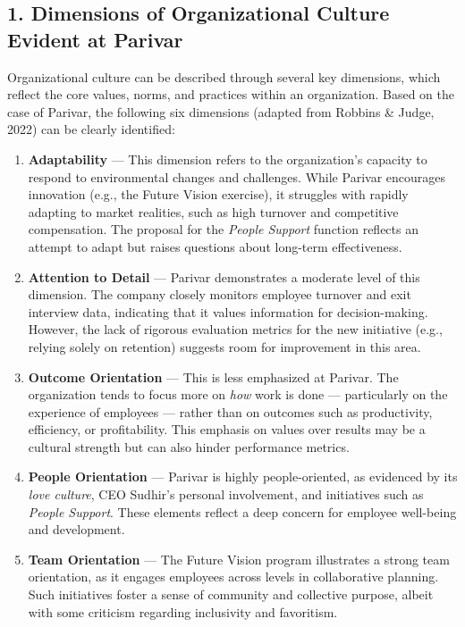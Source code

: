\documentclass[10pt,a4paper]{book}
\begin{document}
\begin{multicols}{2}
\subsection*{1. Dimensions of Organizational Culture Evident at Parivar}

Organizational culture can be described through several key dimensions, which reflect the core values, norms, and practices within an organization. Based on the case of Parivar, the following six dimensions (adapted from Robbins \& Judge, 2022) can be clearly identified:

\begin{enumerate}
    \item \textbf{Adaptability} --- This dimension refers to the organization's capacity to respond to environmental changes and challenges. While Parivar encourages innovation (e.g., the Future Vision exercise), it struggles with rapidly adapting to market realities, such as high turnover and competitive compensation. The proposal for the \textit{People Support} function reflects an attempt to adapt but raises questions about long-term effectiveness.

    \item \textbf{Attention to Detail} --- Parivar demonstrates a moderate level of this dimension. The company closely monitors employee turnover and exit interview data, indicating that it values information for decision-making. However, the lack of rigorous evaluation metrics for the new initiative (e.g., relying solely on retention) suggests room for improvement in this area.

    \item \textbf{Outcome Orientation} --- This is less emphasized at Parivar. The organization tends to focus more on \textit{how} work is done — particularly on the experience of employees — rather than on outcomes such as productivity, efficiency, or profitability. This emphasis on values over results may be a cultural strength but can also hinder performance metrics.

    \item \textbf{People Orientation} --- Parivar is highly people-oriented, as evidenced by its \textit{love culture}, CEO Sudhir's personal involvement, and initiatives such as \textit{People Support}. These elements reflect a deep concern for employee well-being and development.

    \item \textbf{Team Orientation} --- The Future Vision program illustrates a strong team orientation, as it engages employees across levels in collaborative planning. Such initiatives foster a sense of community and collective purpose, albeit with some criticism regarding inclusivity and favoritism.


\end{enumerate}
\end{multicols}
\end{document}
